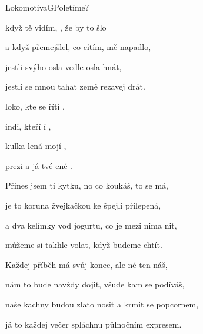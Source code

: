 \begin{song}{Lokomotiva}{G}{Poletíme?}

\begin{SBVerse}

 když tě vidím, , že by to šlo

a když  přemejšlel, co cítím,  mě napadlo,

jestli  svýho osla vedle  osla hnát,

jestli  se mnou tahat země rezavej drát.

\end{SBVerse}

\begin{SBChorus}

 loko, kte se řítí ,

 indi, kteří í ,

 kulka lená mojí ,

 prezi a já tvé ené .

\end{SBChorus}

\begin{SBVerse}

Přines jsem ti kytku, no co koukáš, to se má,

je to koruna žvejkačkou ke špejli přilepená,

a dva kelímky vod jogurtu, co je mezi nima niť,

můžeme si takhle volat, když budeme chtít.

\end{SBVerse}

\begin{SBChorus}

\end{SBChorus}

\begin{SBVerse}

Každej příběh má svůj konec, ale né ten náš,

nám to bude navždy dojit, všude kam se podíváš,

naše kachny budou zlato nosit a krmit se popcornem,

já to každej večer spláchnu půlnočním expresem.

\end{SBVerse}


\end{song}
